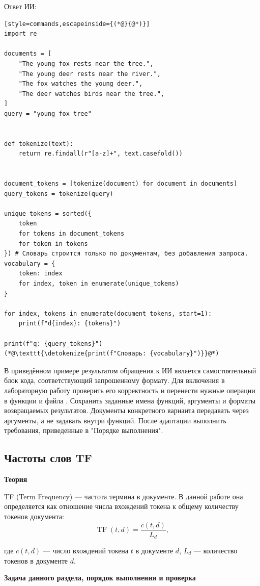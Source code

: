 \documentclass[12pt,a4paper]{article}
\newcommand{\micro}[1]{\subsection{#1}}
\newcommand{\taskhead}[1]{\par\textbf{#1}\par}
\begin{document}
{Ответ ИИ:

\begin{lstlisting}[style=commands,escapeinside={(*@}{@*)}]
import re

documents = [
    "The young fox rests near the tree.",
    "The young deer rests near the river.",
    "The fox watches the young deer.",
    "The deer watches birds near the tree.",
]
query = "young fox tree"


def tokenize(text):
    return re.findall(r"[a-z]+", text.casefold())


document_tokens = [tokenize(document) for document in documents]
query_tokens = tokenize(query)

unique_tokens = sorted({
    token
    for tokens in document_tokens
    for token in tokens
}) # Словарь строится только по документам, без добавления запроса.
vocabulary = {
    token: index
    for index, token in enumerate(unique_tokens)
}

for index, tokens in enumerate(document_tokens, start=1):
    print(f"d{index}: {tokens}")

print(f"q: {query_tokens}")
(*@\texttt{\detokenize{print(f"Словарь: {vocabulary}")}}@*)
\end{lstlisting}

В приведённом примере результатом обращения к ИИ является
самостоятельный блок кода, соответствующий запрошенному формату.
Для включения в лабораторную работу проверить его корректность
и перенести нужные операции в функции 
и  файла .
Сохранить заданные имена функций, аргументы и форматы
возвращаемых результатов. Документы конкретного варианта
передавать через аргументы, а не задавать внутри функций.
После адаптации выполнить требования, приведенные в "Порядке выполнения".}

\micro{Частоты слов TF}
\taskhead{Теория}


TF (Term Frequency) --- частота термина в документе.
В данной работе она определяется как отношение числа
вхождений токена к общему количеству токенов документа:
\[
\operatorname{TF}(t,d)=\frac{c(t,d)}{L_d},
\]

где $c(t,d)$ --- число вхождений токена $t$ в документе $d$, $L_d$ --- количество токенов в документе $d$.

\taskhead{Задача данного раздела, порядок выполнения и проверка}
\end{document}
